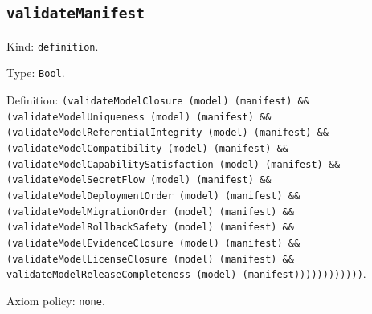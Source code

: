\documentclass[11pt]{article}
\begin{document}
\subsection*{\texttt{validateManifest}}
\noindent Kind: \texttt{definition}.\par
\noindent Type: \texttt{Bool}.\par
\noindent Definition: \texttt{(validateModelClosure (model) (manifest) \&\& (validateModelUniqueness (model) (manifest) \&\& (validateModelReferentialIntegrity (model) (manifest) \&\& (validateModelCompatibility (model) (manifest) \&\& (validateModelCapabilitySatisfaction (model) (manifest) \&\& (validateModelSecretFlow (model) (manifest) \&\& (validateModelDeploymentOrder (model) (manifest) \&\& (validateModelMigrationOrder (model) (manifest) \&\& (validateModelRollbackSafety (model) (manifest) \&\& (validateModelEvidenceClosure (model) (manifest) \&\& (validateModelLicenseClosure (model) (manifest) \&\& validateModelReleaseCompleteness (model) (manifest))))))))))))}.\par
\noindent Axiom policy: \texttt{none}.\par
\end{document}

